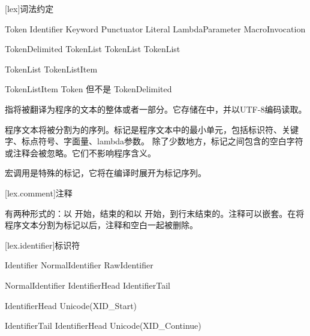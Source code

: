 
[lex]{词法约定}

\begin{bnf}{Token}
    Identifier \br
    Keyword \br
    Punctuator \br
    Literal \br
    LambdaParameter \br
    MacroInvocation
\end{bnf}

\begin{bnf}{TokenDelimited}
    \terminal{(} TokenList\bnfq \terminal{)} \br
    \terminal{[} TokenList\bnfq \terminal{]} \br
    \terminal{\{} TokenList\bnfq \terminal{\}}
\end{bnf}

\begin{bnf}{TokenList}
    TokenListItem\bnfp
\end{bnf}

\begin{bnf}{TokenListItem}
    Token \textnormal{但不是} \terminal{( ) [ ] \{ \}} \br
    TokenDelimited
\end{bnf}

\pnum
{}指将被翻译为\X{}程序的文本的整体或者一部分。它存储在中，并以UTF-8编码读取。

\pnum
程序文本将被分割为的序列。标记是程序文本中的最小单元，包括标识符、关键字、标点符号、字面量、lambda参数。
除了少数地方，标记之间包含的空白字符或注释会被忽略。它们不影响程序含义。

\pnum
宏调用是特殊的标记，它将在编译时展开为标记序列。

[lex.comment]{注释}

\pnum
有两种形式的：以\tcode{/*} 开始，\tcode{*/}结束的和以\tcode{//} 开始，到行末结束的。注释可以嵌套。在将程序文本分割为标记以后，注释和空白一起被删除。

[lex.identifier]{标识符}

\begin{bnf}{Identifier}
    NormalIdentifier \br
    RawIdentifier
\end{bnf}

\begin{bnf}{NormalIdentifier}
    IdentifierHead IdentifierTail\bnfs
\end{bnf}

\begin{bnf}{IdentifierHead}
    Unicode(XID_Start) \br
    \terminal{_}
\end{bnf}

\begin{bnf}{IdentifierTail}
    IdentifierHead \br
    Unicode(XID_Continue)
\end{bnf}

